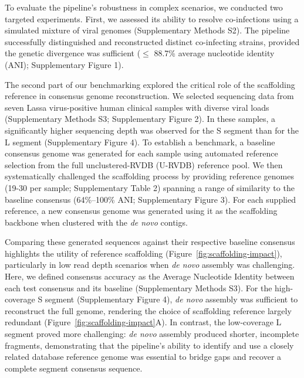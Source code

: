 To evaluate the pipeline’s robustness in complex scenarios, we conducted two targeted experiments. First, we assessed its ability to resolve co-infections using a simulated mixture of viral genomes (Supplementary Methods S2). The pipeline successfully distinguished and reconstructed distinct co-infecting strains, provided the genetic divergence was sufficient ($\le$ 88.7\% average nucleotide identity (ANI); Supplementary Figure 1).

The second part of our benchmarking explored the critical role of the scaffolding reference in consensus genome reconstruction. We selected sequencing data from seven Lassa virus-positive human clinical samples with diverse viral loads (Supplementary Methods S3; Supplementary Figure 2). In these samples, a significantly higher sequencing depth was observed for the S segment than for the L segment (Supplementary Figure 4). To establish a benchmark, a baseline consensus genome was generated for each sample using automated reference selection from the full unclustered-RVDB (U-RVDB) reference pool. We then systematically challenged the scaffolding process by providing reference genomes (19-30 per sample; Supplementary Table 2) spanning a range of similarity to the baseline consensus (64\%--100\% ANI; Supplementary Figure 3). For each supplied reference, a new consensus genome was generated using it as the scaffolding backbone when clustered with the \textit{de novo} contigs.

Comparing these generated sequences against their respective baseline consensus highlights the utility of reference scaffolding (Figure~\ref{fig:scaffolding-impact}), particularly in low read depth scenarios when \textit{de novo} assembly was challenging. Here, we defined consensus accuracy as the Average Nucleotide Identity between each test consensus and its baseline (Supplementary Methods S3). For the high-coverage S segment (Supplementary Figure 4), \textit{de novo} assembly was sufficient to reconstruct the full genome, rendering the choice of scaffolding reference largely redundant (Figure~\ref{fig:scaffolding-impact}A). In contrast, the low-coverage L segment proved more challenging: \textit{de novo} assembly produced shorter, incomplete fragments, demonstrating that the pipeline’s ability to identify and use a closely related database reference genome was essential to bridge gaps and recover a complete segment consensus sequence.


